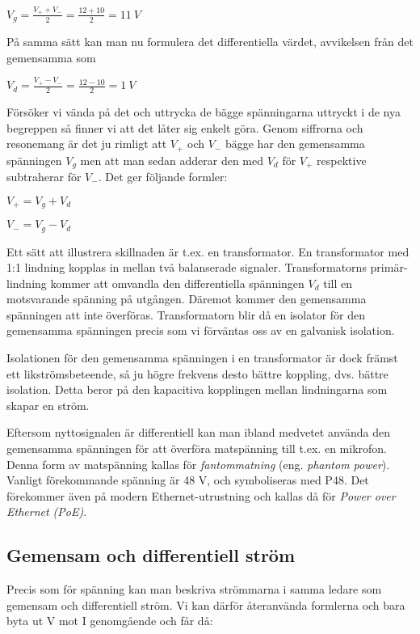 \(V_g = \frac{V_+ + V_-}{2} = \frac{12+10}{2} = 11\ V\)

På samma sätt kan man nu formulera det differentiella värdet, avvikelsen från
det gemensamma som

\(V_d = \frac{V_+ - V_-}{2} = \frac{12-10}{2} = 1\ V\)

Försöker vi vända på det och uttrycka de bägge spänningarna uttryckt i de nya
begreppen så finner vi att det låter sig enkelt göra. Genom siffrorna och
resonemang är det ju rimligt att \(V_+\) och \(V_-\) bägge har den gemensamma
spänningen \(V_g\) men att man sedan adderar den med \(V_d\) för \(V_+\)
respektive subtraherar för \(V_-\). Det ger följande formler:

\(V_+ = V_g + V_d\)

\(V_- = V_g - V_d\)

Ett sätt att illustrera skillnaden är t.ex. en transformator. En transformator
med 1:1 lindning kopplas in mellan två balanserade signaler. Transformatorns
primär-lindning kommer att omvandla den differentiella spänningen \(V_d\) till en
motsvarande spänning på utgången. Däremot kommer den gemensamma spänningen att
inte överföras. Transformatorn blir då en isolator för den gemensamma spänningen
precis som vi förväntas oss av en galvanisk isolation.

Isolationen för den gemensamma spänningen i en transformator är dock främst ett
likströmsbeteende, så ju högre frekvens desto bättre koppling, dvs. bättre
isolation. Detta beror på den kapacitiva kopplingen mellan lindningarna som
skapar en ström.

Eftersom nyttosignalen är differentiell kan man ibland medvetet använda den
gemensamma spänningen för att överföra matspänning till t.ex. en mikrofon.
Denna form av matspänning kallas för \emph{fantommatning} (eng. \emph{phantom
power}). Vanligt förekommande spänning är 48 V, och symboliseras med P48.
Det förekommer även på modern Ethernet-utrustning och kallas då för
\emph{Power over Ethernet (PoE)}.

\subsection{Gemensam och differentiell ström}
\label{comdiffi}

Precis som för spänning kan man beskriva strömmarna i samma ledare som
gemensam och differentiell ström. Vi kan därför återanvända formlerna och bara
byta ut V mot I genomgående och får då:

